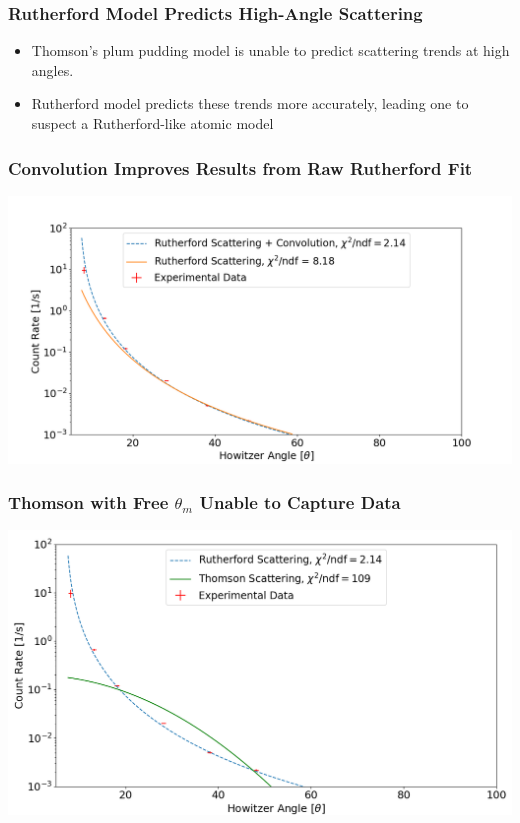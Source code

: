 \documentclass{beamer}
\begin{document}
\begin{frame}
  \frametitle{Rutherford Model Predicts High-Angle Scattering}
  \begin{itemize}
    \pause
  \item Thomson's plum pudding model is unable to predict scattering trends at high angles.
    \pause
  \item Rutherford model predicts these trends more accurately, leading one to suspect a Rutherford-like atomic model
\end{itemize}
  \end{frame}

\begin{frame}
  \frametitle{Convolution Improves Results from Raw Rutherford Fit}
  \includegraphics[width=1.0\textwidth]{plot-conv.png}
\end{frame}

\begin{frame}
  \frametitle{Thomson with Free $\theta_m$ Unable to Capture Data}
  \includegraphics[width=1.0\textwidth]{free.png}
\end{frame}
\end{document}
